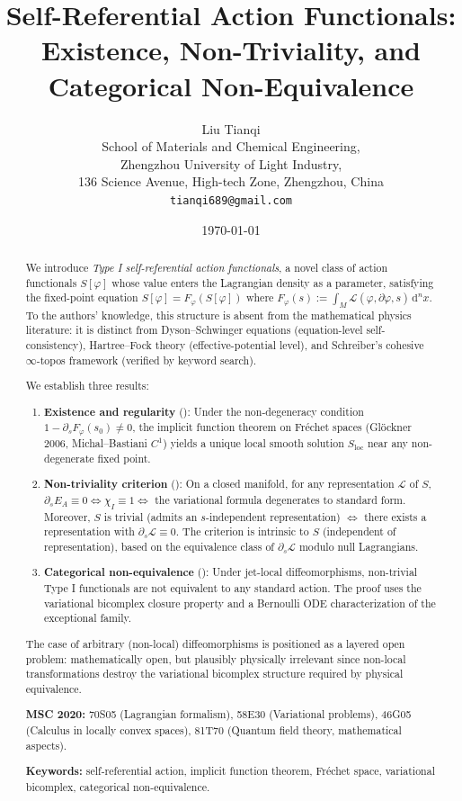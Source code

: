 \documentclass[12pt,letterpaper]{article}
\title{Self-Referential Action Functionals: \\
Existence, Non-Triviality, and Categorical Non-Equivalence}
\author{Liu Tianqi\\
School of Materials and Chemical Engineering,\\
Zhengzhou University of Light Industry,\\
136 Science Avenue, High-tech Zone, Zhengzhou, China\\
\texttt{tianqi689@gmail.com}
}
\date{\today}
\theoremstyle{definition}
\newcommand{\mL}{\mathcal{L}}
\newcommand{\diff}{\mathrm{d}}
\newcommand{\dVol}{\,\diff^n x}
\begin{document}
\maketitle

\begin{abstract}
We introduce \emph{Type I self-referential action functionals}, a novel class of action functionals $S[\varphi]$ whose value enters the Lagrangian density as a parameter, satisfying the fixed-point equation
$S[\varphi] = F_\varphi(S[\varphi])$ where $F_\varphi(s) := \int_M \mL(\varphi, \partial\varphi, s) \dVol$.
To the authors' knowledge, this structure is absent from the mathematical physics literature: it is distinct from Dyson--Schwinger equations (equation-level self-consistency), Hartree--Fock theory (effective-potential level), and Schreiber's cohesive $\infty$-topos framework (verified by keyword search).

We establish three results:
\begin{enumerate}[leftmargin=*]
\item \textbf{Existence and regularity} (): Under the non-degeneracy condition $1 - \partial_s F_\varphi(s_0) \neq 0$, the implicit function theorem on Fr\'echet spaces (Gl\"ockner 2006, Michal--Bastiani $C^1$) yields a unique local smooth solution $S_{\mathrm{loc}}$ near any non-degenerate fixed point.
\item \textbf{Non-triviality criterion} (): On a closed manifold, for any representation $\mL$ of $S$, $\partial_s E_A \equiv 0 \iff \chi_I \equiv 1 \iff$ the variational formula degenerates to standard form. Moreover, $S$ is trivial (admits an $s$-independent representation) $\iff$ there exists a representation with $\partial_s \mL \equiv 0$. The criterion is intrinsic to $S$ (independent of representation), based on the equivalence class of $\partial_s\mathcal{L}$ modulo null Lagrangians.
\item \textbf{Categorical non-equivalence} (): Under jet-local diffeomorphisms, non-trivial Type I functionals are not equivalent to any standard action. The proof uses the variational bicomplex closure property and a Bernoulli ODE characterization of the exceptional family.
\end{enumerate}

The case of arbitrary (non-local) diffeomorphisms is positioned as a layered open problem: mathematically open, but plausibly physically irrelevant since non-local transformations destroy the variational bicomplex structure required by physical equivalence.

\medskip
\noindent\textbf{MSC 2020:} 70S05 (Lagrangian formalism), 58E30 (Variational problems), 46G05 (Calculus in locally convex spaces), 81T70 (Quantum field theory, mathematical aspects).

\medskip
\noindent\textbf{Keywords:} self-referential action, implicit function theorem, Fr\'echet space, variational bicomplex, categorical non-equivalence.
\end{abstract}
\end{document}

